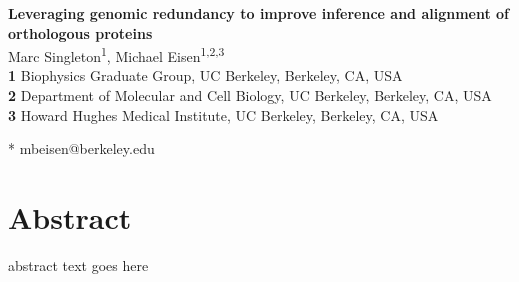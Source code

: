 \documentclass[10pt,letterpaper]{article}
\begin{document}
\linenumbers

\begin{flushleft}
{\Large\textbf{Leveraging genomic redundancy to improve inference and alignment of orthologous proteins}}
\newline
\\
Marc Singleton\textsuperscript{1},
Michael Eisen\textsuperscript{1,2,3}
\\
\bigskip
\textbf{1} Biophysics Graduate Group, UC Berkeley, Berkeley, CA, USA
\\
\textbf{2} Department of Molecular and Cell Biology, UC Berkeley, Berkeley, CA, USA
\\
\textbf{3} Howard Hughes Medical Institute, UC Berkeley, Berkeley, CA, USA
\\
\bigskip

* mbeisen@berkeley.edu

\end{flushleft}

\section*{Abstract}
abstract text goes here
\end{document}
